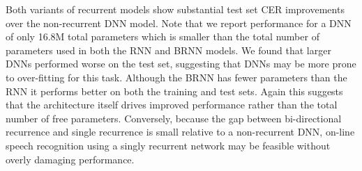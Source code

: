 Both variants of recurrent models show substantial test set CER improvements
over the non-recurrent DNN model. Note that we report performance for a DNN of
only 16.8M total parameters which is smaller than the total number of
parameters used in both the RNN and BRNN models. We found that larger DNNs
performed worse on the test set, suggesting that DNNs may be more prone to
over-fitting for this task. Although the BRNN has fewer parameters than the RNN
it performs better on both the training and test sets. Again this suggests that
the architecture itself drives improved performance rather than the total
number of free parameters. Conversely, because the gap between bi-directional
recurrence and single recurrence is small relative to a non-recurrent DNN,
on-line speech recognition using a singly recurrent network may be feasible
without overly damaging performance.
